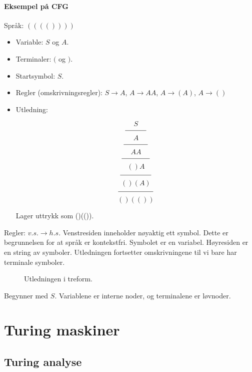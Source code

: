 \documentclass[11pt,a4paper]{article}
\begin{document}
\paragraph{Eksempel på CFG}
Språk: $(((())))$

\begin{itemize}
	\item{Variable: $S$ og $A$.}
	\item{Terminaler: $($ og $)$.}
	\item{Startsymbol: $S$.}
	\item{Regler (omskrivningsregler): $S \rightarrow A$, $A \rightarrow AA$, $A \rightarrow (A)$, $A \rightarrow ()$}
	\item{Utledning: 
\begin{spacing}{0.4}$$ S $$
$$\line(1,0){30}$$
$$ A $$
$$\line(1,0){35}$$
$$ AA $$
$$\line(1,0){40}$$
$$() A$$
$$\line(1,0){45}$$
$$() (A)$$
$$\line(1,0){50}$$
$$() (())$$\end{spacing}}
Lager uttrykk som ()(()).
\end{itemize}

Regler: $v.s. \rightarrow h.s.$
Venstresiden inneholder nøyaktig ett symbol. Dette er begrunnelsen for at språk er kontekstfri. Symbolet er en variabel.
Høyresiden er en string av symboler. Utledningen fortsetter omskrivningene til vi bare har terminale symboler.

\begin{figure}[h!]
\centering
{}
\caption{Utledningen i treform.}
\end{figure}

Begynner med $S$. Variablene er interne noder, og terminalene er løvnoder.

\section{Turing maskiner}
\subsection{Turing analyse}
\end{document}
